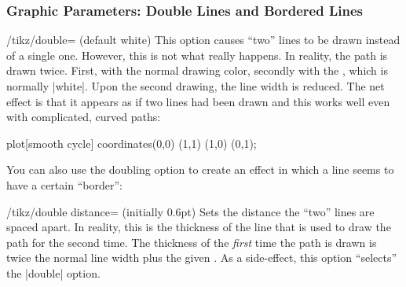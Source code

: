 \subsubsection{Graphic Parameters: Double Lines and Bordered Lines}

\begin{key}{/tikz/double= (default white)}
    This option causes ``two'' lines to be drawn instead of a single one.
    However, this is not what really happens. In reality, the path is drawn
    twice. First, with the normal drawing color, secondly with the , which is normally |white|. Upon the second drawing, the line width
    is reduced. The net effect is that it appears as if two lines had been
    drawn and this works well even with complicated, curved paths:
\begin{codeexample}[]
\tikz \draw[double]
  plot[smooth cycle] coordinates{(0,0) (1,1) (1,0) (0,1)};
\end{codeexample}

    You can also use the doubling option to create an effect in which a line
    seems to have a certain ``border'':
\begin{codeexample}[]
\end{codeexample}
\end{key}

\begin{key}{/tikz/double distance= (initially 0.6pt)}
    Sets the distance the ``two'' lines are spaced apart. In reality, this is
    the thickness of the line that is used to draw the path for the second
    time. The thickness of the \emph{first} time the path is drawn is twice the
    normal line width plus the given . As a side-effect, this
    option ``selects'' the |double| option.
\begin{codeexample}[]
\end{codeexample}
\end{key}

